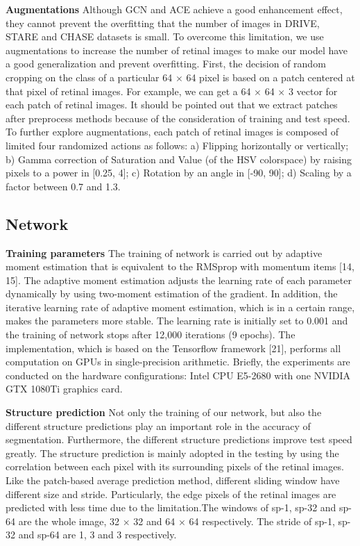 \documentclass{article}
\begin{document}
{\bfseries Augmentations} Although GCN and ACE achieve a good enhancement effect, they cannot prevent the overfitting that the number of images in DRIVE, STARE and CHASE datasets is small. To overcome this limitation, we use augmentations to increase the number of retinal images to make our model have a good generalization and prevent overfitting. First, the decision of random cropping on the class of a particular 64 $\times$ 64 pixel is based on a   patch centered at that pixel of retinal images. For example, we can get a 64 $\times$ 64 $\times$ 3 vector for each patch of retinal images. It should be pointed out that we extract patches after preprocess methods because of the consideration of training and test speed. To further explore augmentations, each patch of retinal images is composed of limited four randomized actions as follows: a) Flipping horizontally or vertically; b) Gamma correction of Saturation and Value (of the HSV colorspace) by raising pixels to a power in [0.25, 4]; c) Rotation by an angle in [-90, 90]; d) Scaling by a factor between 0.7 and 1.3.

\subsection{Network}

{\bfseries Training parameters} The training of network is carried out by adaptive moment estimation that is equivalent to the RMSprop with momentum items [14, 15]. The adaptive moment estimation adjusts the learning rate of each parameter dynamically by using two-moment estimation of the gradient. In addition, the iterative learning rate of adaptive moment estimation, which is in a certain range, makes the parameters more stable. The learning rate is initially set to 0.001 and the training of network stops after 12,000 iterations (9 epochs). The implementation, which is based on the Tensorflow framework [21], performs all computation on GPUs in single-precision arithmetic. Briefly, the experiments are conducted on the hardware configurations: Intel CPU E5-2680 with one NVIDIA GTX 1080Ti graphics card.

{\bfseries Structure prediction} Not only the training of our network, but also the different structure predictions play an important role in the accuracy of segmentation. Furthermore, the different structure predictions improve test speed greatly. The structure prediction is mainly adopted in the testing by using the correlation between each pixel with its surrounding pixels of the retinal images. Like the patch-based average prediction method, different sliding window have different size and stride. Particularly, the edge pixels of the retinal images are predicted with less time due to the limitation.The windows of sp-1, sp-32 and sp-64 are the whole image, 32 $\times$ 32 and 64 $\times$ 64 respectively. The stride of sp-1, sp-32 and sp-64 are 1, 3 and 3 respectively.
\end{document}
